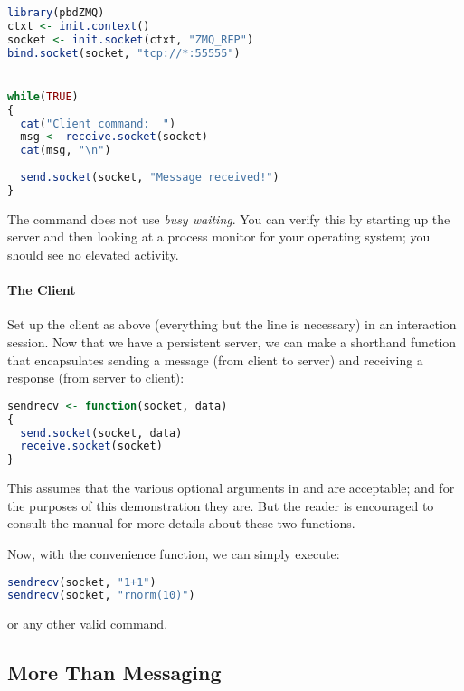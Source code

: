 \begin{lstlisting}[language=R,title=Server]
library(pbdZMQ)
ctxt <- init.context()
socket <- init.socket(ctxt, "ZMQ_REP")
bind.socket(socket, "tcp://*:55555")


while(TRUE)
{
  cat("Client command:  ")
  msg <- receive.socket(socket)
  cat(msg, "\n")
  
  send.socket(socket, "Message received!")
}
\end{lstlisting}

The  command does not use \emph{busy waiting}.  You can
verify this by starting up the server and then looking at a process monitor for
your operating system; you should see no elevated activity.


\paragraph{The Client}

Set up the client as above (everything but the  line is
necessary) in an interaction  session.  Now that we have a 
persistent server, we can make a shorthand function that encapsulates
sending a message (from client to server) and receiving a response (from
server to client):

\begin{lstlisting}[language=R,title=Client Send/Receive]
sendrecv <- function(socket, data)
{
  send.socket(socket, data)
  receive.socket(socket)
}
\end{lstlisting}

This assumes that the various optional arguments in  and
 are acceptable; and for the purposes of this 
demonstration they are.  But the reader is encouraged to consult the
 manual for more details about these two functions.

Now, with the convenience function, we can simply execute:

\begin{lstlisting}[language=R,title=Client Usage]
sendrecv(socket, "1+1")
sendrecv(socket, "rnorm(10)")
\end{lstlisting}

or any other valid  command.




\subsection{More Than Messaging}\label{fullcs}


